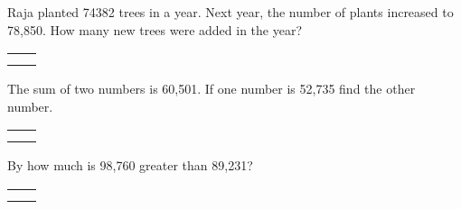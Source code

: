 \begin{enumerate}
    \begin{minipage}{\linewidth}
    \item Raja planted 74382 trees in a year. Next year, the number of plants increased to 78,850.
          How many new trees were added in the year?

    \begin{myTableStyle} \begin{tabular}{ |m{10cm}|m{3cm}| } \hline
        &  \\\hline
        &  \\\hline
        \multicolumn{2}{|c|}{} \\\hline
    \end{tabular} \end{myTableStyle} \vspace{0.08in}
    \end{minipage}

    \item The sum of two numbers is 60,501. If one number is 52,735 find the other number.

    \begin{myTableStyle} \begin{tabular}{ |m{10cm}|m{3cm}| } \hline
        &  \\\hline
        &  \\\hline
        \multicolumn{2}{|c|}{} \\\hline
    \end{tabular} \end{myTableStyle} \vspace{0.08in}

    \item By how much is 98,760 greater than 89,231?

    \begin{myTableStyle} \begin{tabular}{ |m{10cm}|m{3cm}| } \hline
        &  \\\hline
        &  \\\hline
        \multicolumn{2}{|c|}{} \\\hline
    \end{tabular} \end{myTableStyle} \vspace{0.08in}

\end{enumerate}
